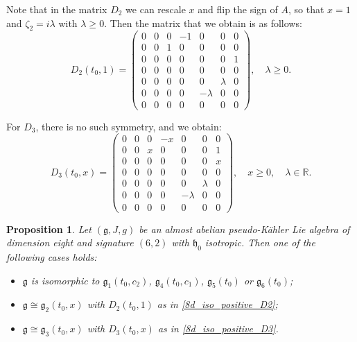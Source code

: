 \documentclass{article}
\newtheorem{proposition}[theorem]{Proposition}
\theoremstyle{definition}
\newcommand{\R}{\mathbb{R}}
\newcommand{\frg}{\mathfrak{g}}
\newcommand{\frh}{\mathfrak{h}}
\begin{document}
Note that in the matrix $D_2$ we can rescale $x$ and flip the sign of $A$, so that $x=1$ and $\zeta_2=i\lambda$ with $\lambda\geq0$. Then the matrix that we obtain is as follows: \begin{equation}\label{8d_iso_positive_D2}
D_2(t_0,1)=\left(\begin{smallmatrix}
    0 & 0 & 0 & -1 & 0 & 0 & 0 \\
    0 & 0 & 1 & 0 & 0 & 0 & 0 \\
    0 & 0 & 0 & 0 & 0 & 0 & 1 \\
    0 & 0 & 0 & 0 & 0 & 0 & 0 \\
    0 & 0 & 0 & 0 & 0 & \lambda & 0 \\
    0 & 0 & 0 & 0 & -\lambda & 0 & 0 \\
    0 & 0 & 0 & 0 & 0 & 0 & 0
\end{smallmatrix}\right),\quad\lambda\geq0.\end{equation}

For $D_3$, there is no such symmetry, and we obtain: \begin{equation}\label{8d_iso_positive_D3}
D_3(t_0,x)=\left(\begin{smallmatrix}
    0 & 0 & 0 & -x & 0 & 0 & 0 \\
    0 & 0 & x & 0 & 0 & 0 & 1 \\
    0 & 0 & 0 & 0 & 0 & 0 & x \\
    0 & 0 & 0 & 0 & 0 & 0 & 0 \\
    0 & 0 & 0 & 0 & 0 & \lambda & 0 \\
    0 & 0 & 0 & 0 & -\lambda & 0 & 0 \\
    0 & 0 & 0 & 0 & 0 & 0 & 0
\end{smallmatrix}\right),\quad x\geq0,\quad\lambda\in\R.\end{equation}

\begin{proposition}
    Let $(\frg,J,g)$ be an almost abelian pseudo-Kähler Lie algebra of dimension eight and signature $(6,2)$ with $\frh_0$ isotropic. Then one of the following cases holds: \begin{itemize}
        \item $\frg$ is isomorphic to $\frg_1(t_0,c_2)$, $\frg_4(t_0,c_1)$, $\frg_5(t_0)$ or $\frg_6(t_0)$;
        \item $\frg\cong\frg_2(t_0,x)$ with $D_2(t_0,1)$ as in \eqref{8d_iso_positive_D2};
        \item $\frg\cong\frg_3(t_0,x)$ with $D_3(t_0,x)$ as in \eqref{8d_iso_positive_D3}.
    \end{itemize}
\end{proposition}
\end{document}
